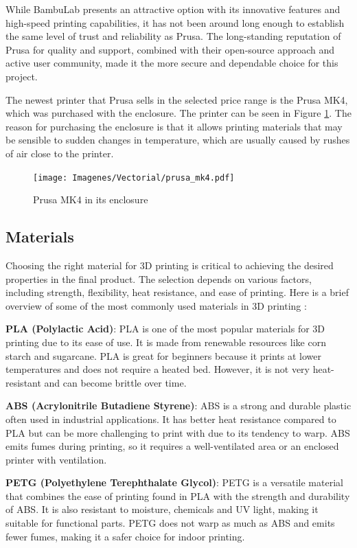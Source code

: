 While BambuLab presents an attractive option with its innovative features and high-speed printing 
capabilities, it has not been around long enough to establish the same level of trust and 
reliability as Prusa. The long-standing reputation of Prusa for quality and support, combined with 
their open-source approach and active user community, made it the more secure and dependable 
choice for this project.

The newest printer that Prusa sells in the selected price range is the Prusa MK4, which was 
purchased with the enclosure. The printer can be seen in Figure \ref{fig:prusa_mk4}. The reason 
for purchasing the enclosure is that it allows printing materials that may be sensible to sudden 
changes in temperature, which are usually caused by rushes of air close to the printer.

\begin{figure}[h]
	\centering
	\texttt{[image: Imagenes/Vectorial/prusa\_mk4.pdf]}
	\caption{Prusa MK4 in its enclosure}
	\label{fig:prusa_mk4}
\end{figure}

\subsection{Materials}

Choosing the right material for 3D printing is critical to achieving the desired properties in the 
final product. The selection depends on various factors, including strength, flexibility, heat 
resistance, and ease of printing. Here is a brief overview of some of the most commonly used 
materials in 3D printing \cite{3dprinting_materials}:

\textbf{PLA (Polylactic Acid)}: PLA is one of the most popular materials for 3D printing due to 
its ease of use. It is made from renewable resources like corn starch and sugarcane. PLA is great 
for beginners because it prints at lower temperatures and does not require a heated bed. However, 
it is not very heat-resistant and can become brittle over time.

\textbf{ABS (Acrylonitrile Butadiene Styrene)}: ABS is a strong and durable plastic often used in 
industrial applications. It has better heat resistance compared to PLA but can be more challenging 
to print with due to its tendency to warp. ABS emits fumes during printing, so it requires a 
well-ventilated area or an enclosed printer with ventilation.

\textbf{PETG (Polyethylene Terephthalate Glycol)}: PETG is a versatile material that combines the 
ease of printing found in PLA with the strength and durability of ABS. It is also resistant to 
moisture, chemicals and UV light, making it suitable for functional parts. PETG does not warp as 
much as ABS and emits fewer fumes, making it a safer choice for indoor printing.


